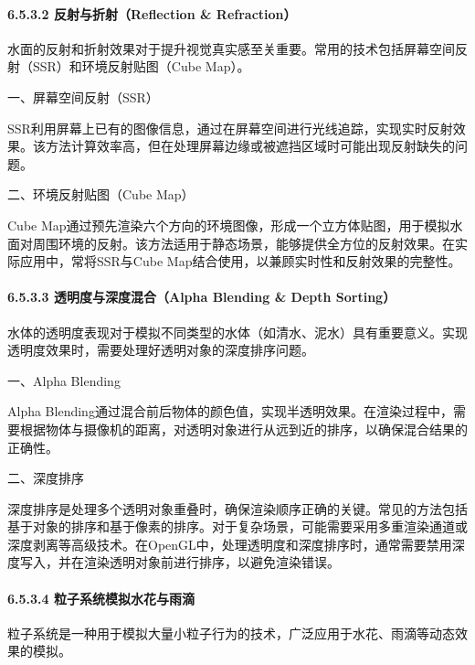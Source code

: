 \paragraph{6.5.3.2 反射与折射（Reflection \& Refraction）}\label{ux53cdux5c04ux4e0eux6298ux5c04reflection-refraction}

水面的反射和折射效果对于提升视觉真实感至关重要。常用的技术包括屏幕空间反射（SSR）和环境反射贴图（Cube Map）。

一、屏幕空间反射（SSR）

SSR利用屏幕上已有的图像信息，通过在屏幕空间进行光线追踪，实现实时反射效果。该方法计算效率高，但在处理屏幕边缘或被遮挡区域时可能出现反射缺失的问题。

二、环境反射贴图（Cube Map）

Cube Map通过预先渲染六个方向的环境图像，形成一个立方体贴图，用于模拟水面对周围环境的反射。该方法适用于静态场景，能够提供全方位的反射效果。在实际应用中，常将SSR与Cube Map结合使用，以兼顾实时性和反射效果的完整性。

\paragraph{6.5.3.3 透明度与深度混合（Alpha Blending \& Depth Sorting）}\label{ux900fux660eux5ea6ux4e0eux6df1ux5ea6ux6df7ux5408alpha-blending-depth-sorting}

水体的透明度表现对于模拟不同类型的水体（如清水、泥水）具有重要意义。实现透明度效果时，需要处理好透明对象的深度排序问题。

一、Alpha Blending

Alpha Blending通过混合前后物体的颜色值，实现半透明效果。在渲染过程中，需要根据物体与摄像机的距离，对透明对象进行从远到近的排序，以确保混合结果的正确性。

二、深度排序

深度排序是处理多个透明对象重叠时，确保渲染顺序正确的关键。常见的方法包括基于对象的排序和基于像素的排序。对于复杂场景，可能需要采用多重渲染通道或深度剥离等高级技术。在OpenGL中，处理透明度和深度排序时，通常需要禁用深度写入，并在渲染透明对象前进行排序，以避免渲染错误。

\paragraph{6.5.3.4 粒子系统模拟水花与雨滴}\label{ux7c92ux5b50ux7cfbux7edfux6a21ux62dfux6c34ux82b1ux4e0eux96e8ux6ef4}

粒子系统是一种用于模拟大量小粒子行为的技术，广泛应用于水花、雨滴等动态效果的模拟。

